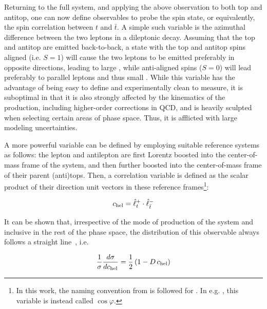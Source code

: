Returning to the full \ttbar system, and applying the above observation to both top and antitop, one can now define observables to probe the \ttbar spin state, or equivalently, the spin correlation between $t$ and $\bar{t}$. A simple such variable is the azimuthal difference \dphill between the two leptons in a dileptonic decay. Assuming that the top and antitop are emitted back-to-back, a state with the top and antitop spins aligned (i.e. $S=1$) will cause the two leptons to be emitted preferably in opposite directions, leading to large \dphill, while anti-aligned spins ($S=0$) will lead preferably to parallel leptons and thus small \dphill. While this variable has the advantage of being easy to define and experimentally clean to measure, it is suboptimal in that it is also strongly affected by the kinematics of the \ttbar production, including higher-order corrections in QCD, and is heavily sculpted when selecting certain areas of \ttbar phase space. Thus, it is afflicted with large modeling uncertainties.

A more powerful variable can be defined by employing suitable reference systems as follows: the lepton and antilepton are first Lorentz boosted into the center-of-mass frame of the \ttbar system, and then further boosted into the center-of-mass frame of their parent (anti)tops. Then, a correlation variable \chel is defined as the scalar product of their direction unit vectors in these reference frames\footnote{
In this work, the naming convention from  is followed for \chel. In e.g. , this variable is instead called $\cos \varphi$.
}:

\begin{equation}
\label{eq:theory:cheldef}
    c_{\mathrm{hel}} = \hat{\ell}^+_{t} \cdot \hat{\ell}^-_{\bar{t}} 
\end{equation}

It can be shown that, irrespective of the mode of production of the \ttbar system and inclusive in the rest of the phase space, the distribution of this observable always follows a straight line~\cite{Bernreuther:2004jv}, i.e.

\begin{equation}
\label{eq:theory:chel}
    \frac{1}{\sigma} \frac{d \sigma}{d c_{\mathrm{hel}}} = \frac{1}{2} \left( 1 - D \, c_{\mathrm{hel}} \right)
\end{equation}

